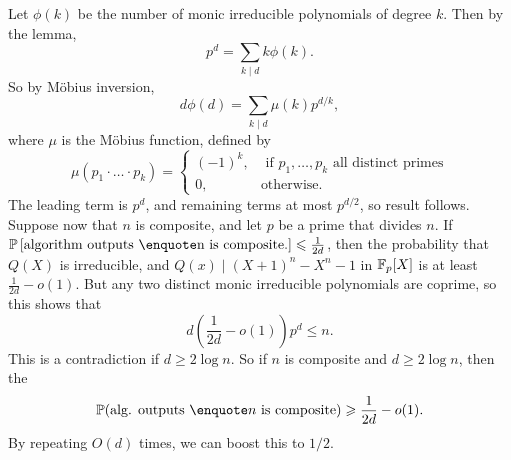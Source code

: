 \documentclass{article}
\begin{document}
\proof Let $\phi(k)$ be the number of monic irreducible polynomials of degree $k$. Then by the lemma, \[ p^{d} = \sum_{k \mid d} k \phi(k).\]
So by M\"obius inversion, \[d \phi(d) = \sum_{k \mid d} \mu(k)p^{d/k},\] where $\mu$ is the M\"obius function, defined by \[ \mu(p_{1} \cdot \dots \cdot p_{k})= \begin{cases}
    (-1)^{k}, & \text{ if $p_{1},\dots,p_{k}$ all distinct primes}\\
    0, & \text{otherwise.}
\end{cases}\]
The leading term is $p^{d}$, and remaining terms at most $p^{d/2}$, so result follows. Suppose now that $n$ is composite, and let $p$ be a prime that divides $n$. If $\bbP\left[ \text{algorithm outputs \say{n is composite.}}\right] \leq \frac{1}{2d}$, then the probability that $Q(X)$ is irreducible, and $Q(x) \mid (X+1)^{n}-X^{n}-1$ in $\mathbb{F}_{p}[X]$ is at least $\frac{1}{2d}- o(1)$. But any two distinct monic irreducible polynomials are coprime, so this shows that \[ d\left(\frac{1}{2d}-o(1)\right)p^{d} \leq n.\] 
This is a contradiction if $d \geq 2\log n$. So if $n$ is composite and $d \geq 2 \log n$, then the \[ \bbP(\text{alg. outputs \say{$n$ is composite}}) \geq \frac{1}{2d}- o(1).\]
By repeating $O(d)$ times, we can boost this to $1/2$. 
\end{document}
